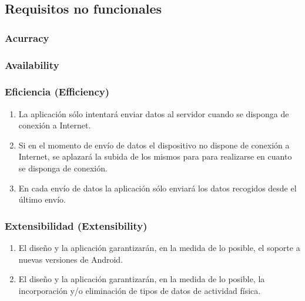     
    \subsection{Requisitos no funcionales}
        \label{req:especificos:no_funcionales}
        \subsubsection{Acurracy}
        \subsubsection{Availability}
        \subsubsection{Eficiencia (Efficiency)}
            \begin{enumerate}[label=\textbf{\texttt{RNF-\arabic*}}]
                \item \label{req:no_funcionales:envio_internet} La aplicación sólo intentará enviar datos al servidor cuando se disponga de conexión a Internet.
                \item \label{req:no_funcionales:envio_aplazar} Si en el momento de envío de datos el dispositivo no dispone de conexión a Internet, se aplazará la subida de los mismos para para realizarse en cuanto se disponga de conexión.
                \item \label{req:no_funcionales:envio_solo_ultimos} En cada envío de datos la aplicación sólo enviará los datos recogidos desde el último envío.
            \end{enumerate}
        \subsubsection{Extensibilidad (Extensibility)}
            \begin{enumerate}[resume, label=\textbf{\texttt{RNF-\arabic*}}]
                \item \label{req:no_funcionales:nuevas_versiones_android} El diseño y la aplicación garantizarán, en la medida de lo posible, el soporte a nuevas versiones de Android.
                \item \label{req:no_funcionales:nuevas_categorias_fisicas} El diseño y la aplicación garantizarán, en la medida de lo posible, la incorporación y/o eliminación de tipos de datos de actividad física.
            \end{enumerate}
